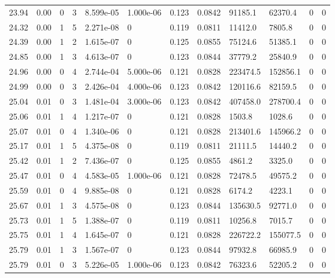 \documentclass[preview]{standalone}
\begin{document}
{{{{{{{\begin{tabular}{L{1.2cm}C{1.2cm} C{0.3cm}C{0.5cm} C{1.4cm}C{1.4cm} C{1.4cm}C{1.4cm} C{1.6cm}C{1.6cm} C{1.6cm}C{1.6cm}}
  23.94  &  0.00  & 0     &  3 &  8.599e-05  & 1.000e-06  &  0.123&   0.0842& 91185.1 & 62370.4   &  0 & 0  \\ 
  24.32  &  0.00  & 1     &  5 &  2.271e-08  & 0  &  0.119&   0.0811& 11412.0 & 7805.8   &  0 & 0  \\ 
  24.39  &  0.00  & 1     &  2 &  1.615e-07  & 0  &  0.125&   0.0855& 75124.6 & 51385.1   &  0 & 0  \\ 
  24.85  &  0.00  & 1     &  3 &  4.613e-07  & 0  &  0.123&   0.0844& 37779.2 & 25840.9   &  0 & 0  \\ 
  24.96  &  0.00  & 0     &  4 &  2.744e-04  & 5.000e-06  &  0.121&   0.0828& 223474.5 & 152856.1   &  0 & 0  \\ 
  24.99  &  0.00  & 0     &  3 &  2.426e-04  & 4.000e-06  &  0.123&   0.0842& 120116.6 & 82159.5   &  0 & 0  \\ 
  25.04  &  0.01  & 0     &  3 &  1.481e-04  & 3.000e-06  &  0.123&   0.0842& 407458.0 & 278700.4   &  0 & 0  \\ 
  25.06  &  0.01  & 1     &  4 &  1.217e-07  & 0  &  0.121&   0.0828& 1503.8 & 1028.6   &  0 & 0  \\ 
  25.07  &  0.01  & 0     &  4 &  1.340e-06  & 0  &  0.121&   0.0828& 213401.6 & 145966.2   &  0 & 0  \\ 
  25.17  &  0.01  & 1     &  5 &  4.375e-08  & 0  &  0.119&   0.0811& 21111.5 & 14440.2   &  0 & 0  \\ 
  25.42  &  0.01  & 1     &  2 &  7.436e-07  & 0  &  0.125&   0.0855& 4861.2 & 3325.0   &  0 & 0  \\ 
  25.47  &  0.01  & 0     &  4 &  4.583e-05  & 1.000e-06  &  0.121&   0.0828& 72478.5 & 49575.2   &  0 & 0  \\ 
  25.59  &  0.01  & 0     &  4 &  9.885e-08  & 0  &  0.121&   0.0828& 6174.2 & 4223.1   &  0 & 0  \\ 
  25.67  &  0.01  & 1     &  3 &  4.575e-08  & 0  &  0.123&   0.0844& 135630.5 & 92771.0   &  0 & 0  \\ 
  25.73  &  0.01  & 1     &  5 &  1.388e-07  & 0  &  0.119&   0.0811& 10256.8 & 7015.7   &  0 & 0  \\ 
  25.75  &  0.01  & 1     &  4 &  1.645e-07  & 0  &  0.121&   0.0828& 226722.2 & 155077.5   &  0 & 0  \\ 
  25.79  &  0.01  & 1     &  3 &  1.567e-07  & 0  &  0.123&   0.0844& 97932.8 & 66985.9   &  0 & 0  \\ 
  25.79  &  0.01  & 0     &  3 &  5.226e-05  & 1.000e-06  &  0.123&   0.0842& 76323.6 & 52205.2   &  0 & 0  \\ 

\end{tabular}}}}}}}}
\end{document}
